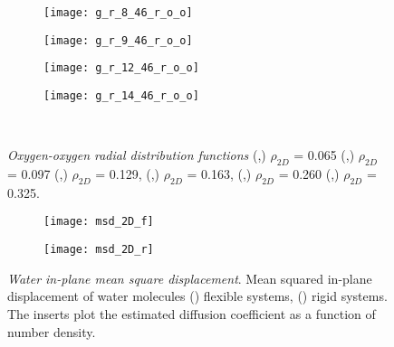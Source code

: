 \documentclass[12pt]{article}
\begin{document}
\begin{figure}[htbp!]
  \begin{subfigure}[b]{0.15\textwidth}
    \texttt{[image: g\_r\_8\_46\_r\_o\_o]}
    \vspace{-15pt} \caption{}
    \label{fig:rg_8_r}
  \end{subfigure}
   \begin{subfigure}[b]{0.15\textwidth}
  \texttt{[image: g\_r\_9\_46\_r\_o\_o]}
    \vspace{-15pt} \caption{}
    \label{fig:rg_9_r}
  \end{subfigure}
  \begin{subfigure}[b]{0.15\textwidth}
    \texttt{[image: g\_r\_12\_46\_r\_o\_o]}
     \vspace{-15pt} \caption{}
    \label{fig:rg_12_r}
  \end{subfigure}
  \begin{subfigure}[b]{0.15\textwidth}
    \texttt{[image: g\_r\_14\_46\_r\_o\_o]}
    \vspace{-15pt} \caption{}
    \label{fig:rg_14_r}
  \end{subfigure}\\
  \caption{\textit{Oxygen-oxygen radial distribution functions} (\protect{},\protect{})  \(\rho_{2D}\) = 0.065 (\protect{},\protect{}) \(\rho_{2D}\) = 0.097 (\protect{},\protect{}) \(\rho_{2D}\) = 0.129, (\protect{},\protect{}) \(\rho_{2D}\) = 0.163, (\protect{},\protect{}) \(\rho_{2D}\) = 0.260 (\protect{},\protect{}) \(\rho_{2D}\) = 0.325.}
  \label{fig:gr}
\end{figure}

\begin{figure}[h!]
	\centering
	\begin{subfigure}[b]{0.49\textwidth}
    \texttt{[image: msd\_2D\_f]}
     \vspace{-15pt} \caption{}
    \label{fig:msd_f}
  \end{subfigure}
  \begin{subfigure}[b]{0.49\textwidth}
    \texttt{[image: msd\_2D\_r]}
     \vspace{-15pt} \caption{}
    \label{fig:msd_r}
  \end{subfigure}
	\caption{\textit{Water in-plane mean square displacement}. Mean squared in-plane displacement of water molecules (\protect{}) flexible systems, (\protect{}) rigid systems. The inserts plot the estimated diffusion coefficient as a function of number density.}
	\label{fig:msd_both}
\end{figure}
\end{document}
